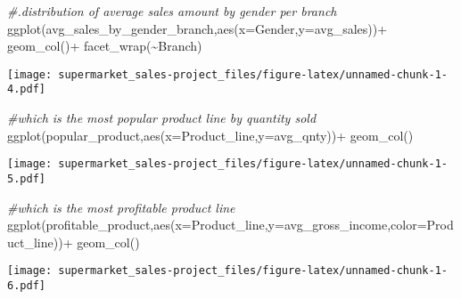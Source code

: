 \documentclass[
]{article}
\newenvironment{Shaded}{\begin{snugshade}}{\end{snugshade}}
\newcommand{\AttributeTok}[1]{\textcolor[rgb]{0.77,0.63,0.00}{#1}}
\newcommand{\CommentTok}[1]{\textcolor[rgb]{0.56,0.35,0.01}{\textit{#1}}}
\newcommand{\FunctionTok}[1]{\textcolor[rgb]{0.00,0.00,0.00}{#1}}
\newcommand{\NormalTok}[1]{#1}
\newcommand{\SpecialCharTok}[1]{\textcolor[rgb]{0.00,0.00,0.00}{#1}}
\begin{document}
\begin{Shaded}
\begin{Highlighting}[]
\CommentTok{\#.distribution of average sales amount by gender per branch}
\FunctionTok{ggplot}\NormalTok{(avg\_sales\_by\_gender\_branch,}\FunctionTok{aes}\NormalTok{(}\AttributeTok{x=}\NormalTok{Gender,}\AttributeTok{y=}\NormalTok{avg\_sales))}\SpecialCharTok{+}
  \FunctionTok{geom\_col}\NormalTok{()}\SpecialCharTok{+}
  \FunctionTok{facet\_wrap}\NormalTok{(}\SpecialCharTok{\textasciitilde{}}\NormalTok{Branch)}
\end{Highlighting}
\end{Shaded}

\texttt{[image: supermarket\_sales-project\_files/figure-latex/unnamed-chunk-1-4.pdf]}

\begin{Shaded}
\begin{Highlighting}[]
\CommentTok{\#which is the most popular product line by quantity sold}
\FunctionTok{ggplot}\NormalTok{(popular\_product,}\FunctionTok{aes}\NormalTok{(}\AttributeTok{x=}\NormalTok{Product\_line,}\AttributeTok{y=}\NormalTok{avg\_qnty))}\SpecialCharTok{+}
  \FunctionTok{geom\_col}\NormalTok{()}
\end{Highlighting}
\end{Shaded}

\texttt{[image: supermarket\_sales-project\_files/figure-latex/unnamed-chunk-1-5.pdf]}

\begin{Shaded}
\begin{Highlighting}[]
\CommentTok{\#which is the most profitable product line}
\FunctionTok{ggplot}\NormalTok{(profitable\_product,}\FunctionTok{aes}\NormalTok{(}\AttributeTok{x=}\NormalTok{Product\_line,}\AttributeTok{y=}\NormalTok{avg\_gross\_income,}\AttributeTok{color=}\NormalTok{Product\_line))}\SpecialCharTok{+}
  \FunctionTok{geom\_col}\NormalTok{()}
\end{Highlighting}
\end{Shaded}

\texttt{[image: supermarket\_sales-project\_files/figure-latex/unnamed-chunk-1-6.pdf]}
\end{document}
